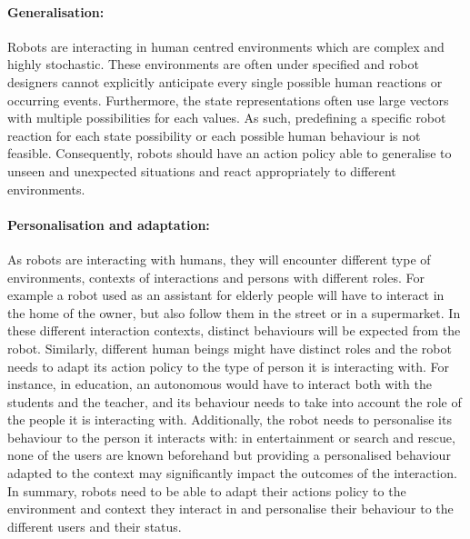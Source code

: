     \paragraph{Generalisation:} Robots are interacting in human centred environments which are complex and highly stochastic. These environments are often under specified and robot designers cannot explicitly anticipate every single possible human reactions or occurring events. Furthermore, the state representations often use large vectors with multiple possibilities for each values. As such, predefining a specific robot reaction for each state possibility or each possible human behaviour is not feasible. Consequently, robots should have an action policy able to generalise to unseen and unexpected situations and react appropriately to different environments.
    
    \paragraph{Personalisation and adaptation: } As robots are interacting with humans, they will encounter different type of environments, contexts of interactions and persons with different roles. For example a robot used as an assistant for elderly people will have to interact in the home of the owner, but also follow them in the street or in a supermarket. In these different interaction contexts, distinct behaviours will be expected from the robot. Similarly, different human beings might have distinct roles and the robot needs to adapt its action policy to the type of person it is interacting with. For instance, in education, an autonomous would have to interact both with the students and the teacher, and its behaviour needs to take into account the role of the people it is interacting with. Additionally, the robot needs to personalise its behaviour to the person it interacts with: in entertainment or search and rescue, none of the users are known beforehand but providing a personalised behaviour adapted to the context may significantly impact the outcomes of the interaction. In summary, robots need to be able to adapt their actions policy to the environment and context they interact in and personalise their behaviour to the different users and their status.

